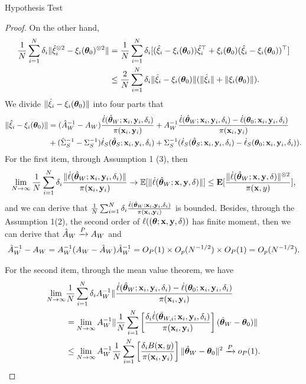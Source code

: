 \documentclass[12pt,hidelinks]{article}
\begin{document}
\begin{section}{Hypothesis Test}
\begin{proof}
On the other hand,
\begin{align*}
    \frac{1}{N} \sum_{i=1}^{N} \delta_i \|\hat \xi_i^{\otimes 2} - \xi_i(\bm{\theta}_0)^{\otimes 2}\| &= \frac{1}{N} \sum_{i=1}^{N} \delta_i [(\hat \xi_i - \xi_i(\bm{\theta}_0)) \hat \xi_i^\top + \xi_i(\bm{\theta}_0)(\hat \xi_i - \xi_i(\bm{\theta}_0))^\top] \\
    &\leq \frac{2}{N} \sum_{i=1}^{N} \delta_i \|\hat \xi_i - \xi_i(\bm{\theta}_0)\| (\|\hat \xi_i\| + \|\xi_i(\bm{\theta}_0)\|).
\end{align*}
We divide $\|\hat \xi_i - \xi_i(\bm{\theta}_0)\|$ into four parts that 
\begin{align*}
    \|\hat \xi_i - \xi_i(\bm{\theta}_0)\| &= (\hat A_W^{-1} - A_W) \frac{\dot \ell({\hat{\bm{\theta}}}_W;\mathbf{x}_i, \mathbf{y}_i, \delta_i)}{\pi(\mathbf{x}_i, \mathbf{y}_i)} + A_W^{-1} \frac{\dot \ell({\hat{\bm{\theta}}}_W;\mathbf{x}_i, \mathbf{y}_i, \delta_i) - \dot \ell(\bm{\theta}_0;\mathbf{x}_i, \mathbf{y}_i, \delta_i)}{\pi(\mathbf{x}_i, \mathbf{y}_i)} \\
    & + (\hat \Sigma_S^{-1} - \Sigma_S^{-1}) \dot \ell_S({\hat{\bm{\theta}}}_S;\mathbf{x}_i, \mathbf{y}_i, \delta_i) + \Sigma_S^{-1} (\dot \ell_S({\hat{\bm{\theta}}}_S;\mathbf{x}_i, \mathbf{y}_i, \delta_i) - \dot \ell_S(\bm{\theta}_0;\mathbf{x}_i, \mathbf{y}_i, \delta_i)).
\end{align*}
For the first item, through Assumption 1 (3), then 
\begin{align*}
    \lim\limits_{N \rightarrow \infty}  \frac{1}{N} \sum_{i=1}^{N} \delta_i \frac{\| \dot \ell({\hat{\bm{\theta}}}_W;\mathbf{x}_i, \mathbf{y}_i, \delta_i) \|}{\pi(\mathbf{x}_i, \mathbf{y}_i)} \rightarrow \mathbb{E}[\| \dot \ell({\hat{\bm{\theta}}}_W;\mathbf{x}, \mathbf{y}, \delta) \|] \leq \mathbf{E}[ \frac{\|\dot \ell({\hat{\bm{\theta}}}_W;\mathbf{x}, \mathbf{y}, \delta)\|^{\otimes 2}}{\pi(\mathbf{x}, y)}],
\end{align*}
and we can derive that $\frac{1}{N} \sum_{i=1}^{N} \delta_i \frac{\dot \ell({\hat{\bm{\theta}}}_W;\mathbf{x}_i, \mathbf{y}_i, \delta_i)}{\pi(\mathbf{x}_i, \mathbf{y}_i)}$ is bounded.
Besides, through the Assumption 1(2), the second order of $\ell((\bm{\theta};\mathbf{x}, \mathbf{y}, \delta))$ has finite moment, then we can derive that $\hat A_W \xrightarrow{P} A_W$ and
\begin{align*}
    \hat A_W^{-1} - A_W = A_W^{-1}(A_W - \hat A_W)\hat A_W^{-1} = O_{P}(1) \times O_{p}(N^{-1/2})  \times O_{P}(1) = O_{p}(N^{-1/2}).
\end{align*}

For the second item, through the mean value theorem, we have
\begin{align*}
    \lim\limits_{N \rightarrow \infty} & \frac{1}{N} \sum_{i=1}^{N} \delta_i A_W^{-1} \| \frac{\dot \ell({\hat{\bm{\theta}}}_W;\mathbf{x}_i, \mathbf{y}_i, \delta_i) - \dot \ell(\bm{\theta}_0;\mathbf{x}_i, \mathbf{y}_i, \delta_i)}{\pi(\mathbf{x}_i, \mathbf{y}_i)}  \\
    & = \lim\limits_{N \rightarrow \infty}  A_W^{-1} \| \frac{1}{N} \sum_{i=1}^{N} \left[ \frac{\delta_i \dot \ell(\bar {\bm{\theta}}_{W,i};\mathbf{x}_i, \mathbf{y}_i, \delta_i)}{\pi(\mathbf{x}_i, \mathbf{y}_i)} \right] ({\hat{\bm{\theta}}}_W - \bm{\theta}_0) \| \\
    & \leq \lim\limits_{N \rightarrow \infty}  A_W^{-1} \frac{1}{N} \sum_{i=1}^{N} \left[\frac{\delta_i B(\mathbf{x}, y)}{\pi(\mathbf{x}_i, \mathbf{y}_i)} \right] \| {\hat{\bm{\theta}}}_W - \bm{\theta}_0 \|^2   
    \xrightarrow{P} o_{P}(1).
\end{align*}


\end{proof}
\end{section}
\end{document}
